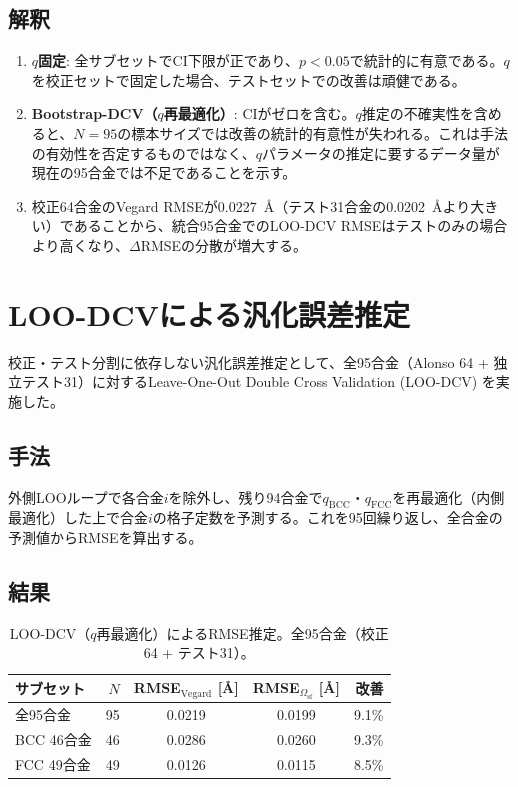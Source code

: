 \documentclass[5p,10pt]{elsarticle}
\begin{document}
\subsection{解釈}

\begin{enumerate}
  \item \textbf{$q$固定}: 全サブセットでCI下限が正であり、$p < 0.05$で統計的に有意である。$q$を校正セットで固定した場合、テストセットでの改善は頑健である。
  \item \textbf{Bootstrap-DCV（$q$再最適化）}: CIがゼロを含む。$q$推定の不確実性を含めると、$N = 95$の標本サイズでは改善の統計的有意性が失われる。これは手法の有効性を否定するものではなく、$q$パラメータの推定に要するデータ量が現在の95合金では不足であることを示す。
  \item 校正64合金のVegard RMSEが0.0227~\AA（テスト31合金の0.0202~\AA{}より大きい）であることから、統合95合金でのLOO-DCV RMSEはテストのみの場合より高くなり、$\Delta$RMSEの分散が増大する。
\end{enumerate}


\section{LOO-DCVによる汎化誤差推定}
\label{sec:appendix_loo_dcv}

校正・テスト分割に依存しない汎化誤差推定として、全95合金（Alonso 64 + 独立テスト31）に対するLeave-One-Out Double Cross Validation (LOO-DCV) を実施した。

\subsection{手法}

外側LOOループで各合金$i$を除外し、残り94合金で$q_\text{BCC}$・$q_\text{FCC}$を再最適化（内側最適化）した上で合金$i$の格子定数を予測する。これを95回繰り返し、全合金の予測値からRMSEを算出する。

\subsection{結果}

\begin{table}[H]
\centering
\caption{LOO-DCV（$q$再最適化）によるRMSE推定。全95合金（校正64 + テスト31）。}
\label{tab:loo_dcv}
\footnotesize
\begin{tabular}{@{}lrccr@{}}
\toprule
サブセット & $N$ & RMSE$_\text{Vegard}$ [\AA] & RMSE$_{\Omega_\text{sf}}$ [\AA] & 改善 \\
\midrule
全95合金 & 95 & 0.0219 & 0.0199 & 9.1\% \\
BCC 46合金 & 46 & 0.0286 & 0.0260 & 9.3\% \\
FCC 49合金 & 49 & 0.0126 & 0.0115 & 8.5\% \\
\bottomrule
\end{tabular}
\end{table}
\end{document}
